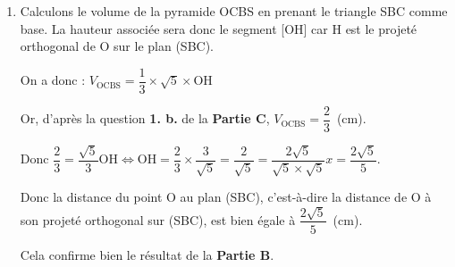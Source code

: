 \documentclass[10pt]{article}
\begin{document}
\begin{enumerate}
		\item Calculons le volume de la pyramide OCBS en prenant le triangle SBC comme base. La hauteur associée sera donc le segment [OH] car H est le projeté orthogonal de O sur le plan (SBC).

On a donc : \quad $ V_{\mathrm{OCBS}} = \dfrac{1}{3} \times \sqrt{5} \times \mathrm{OH}$

Or, d'après la question \textbf{1. b.} de la \textbf{Partie C}, \quad$ V_{\mathrm{OCBS}} = \dfrac{2}{3}$~(cm).

Donc \quad $\dfrac{2}{3}= \dfrac{\sqrt{5}}{3} \mathrm{OH} \iff \mathrm{OH} = \dfrac{2}{3} \times \dfrac{3}{\sqrt{5}} = \dfrac{2}{\sqrt{5}} = \dfrac{2 \sqrt{5}}{\sqrt{5}\times \sqrt{5}}x= \dfrac{2\sqrt{5}}{5}$.

Donc la distance du point O au plan (SBC), c'est-à-dire la distance de O à son projeté orthogonal sur (SBC), est bien égale à $\dfrac{2 \sqrt{5}}{5}$~(cm).

Cela confirme bien le résultat de la \textbf{Partie B}.
	\end{enumerate}
\end{document}
